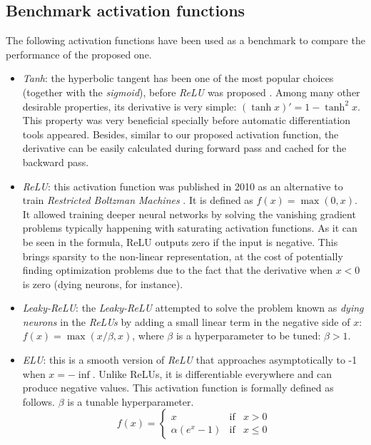 \subsection{Benchmark activation functions}
The following activation functions have been used as a benchmark to compare the performance of the proposed one.


\begin{itemize}
	\item \textit{Tanh}: the hyperbolic tangent has been one of the most popular choices (together with the \textit{sigmoid}), before \textit{ReLU} was proposed \cite{lecun2012}. Among many other desirable properties, its derivative is very simple: $(\tanh x)'=1-\tanh^2 x$. This property was very beneficial specially before automatic differentiation tools appeared. Besides, similar to our proposed activation function, the derivative can be easily calculated during forward pass and cached for the backward pass. 
	\item \textit{ReLU}: this activation function was published in 2010 as an alternative to train \textit{Restricted Boltzman Machines} \cite{nair2010}. It is defined as $f(x) = \max(0,x)$. It allowed training deeper neural networks by solving the vanishing gradient problems typically happening with saturating activation functions. As it can be seen in the formula, ReLU outputs zero if the input is negative. This brings sparsity to the non-linear representation, at the cost of potentially finding optimization problems due to the fact that the derivative when $x<0$ is zero (dying neurons, for instance).
	\item \textit{Leaky-ReLU}: the \textit{Leaky-ReLU} \cite{xu2015} attempted to solve the problem known as \textit{dying neurons} in the \textit{ReLUs} by adding a small linear term in the negative side of $x$: $f(x) = \max(x/\beta, x)$, where $\beta$ is a hyperparameter to be tuned: $\beta>1$.
	\item \textit{ELU}: this is a smooth version of \textit{ReLU} \cite{djork2016} that approaches asymptotically to -1 when $x=-\inf$. Unlike ReLUs, it is differentiable everywhere and can produce negative values. This activation function is formally defined as follows. $\beta$ is a tunable hyperparameter.
	$$
	f(x)= \left\{ \begin{array}{lcc}
		x &   \text{if}  & x > 0 \\
 \alpha(e^x - 1) &  \text{if} & x \leq 0 
	\end{array}
	\right.
	$$
	

\end{itemize}
